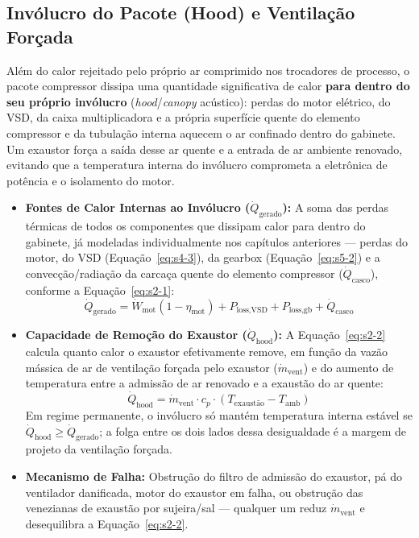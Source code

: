 \documentclass[12pt,a4paper]{article}
\numberwithin{equation}{section}
\numberwithin{table}{section}
\numberwithin{figure}{section}
\begin{document}
{	\subsection{\textbf{Invólucro do Pacote (Hood) e Ventilação Forçada}}
	Além do calor rejeitado pelo próprio ar comprimido nos trocadores de processo, o pacote compressor dissipa uma quantidade significativa de calor \textbf{para dentro do seu próprio invólucro} (\textit{hood}/\textit{canopy} acústico): perdas do motor elétrico, do VSD, da caixa multiplicadora e a própria superfície quente do elemento compressor e da tubulação interna aquecem o ar confinado dentro do gabinete. Um exaustor força a saída desse ar quente e a entrada de ar ambiente renovado, evitando que a temperatura interna do invólucro comprometa a eletrônica de potência e o isolamento do motor.
	\begin{itemize}
		\item \textbf{Fontes de Calor Internas ao Invólucro ($\dot{Q}_{\text{gerado}}$):} A soma das perdas térmicas de todos os componentes que dissipam calor para dentro do gabinete, já modeladas individualmente nos capítulos anteriores — perdas do motor, do VSD (Equação~\eqref{eq:s4-3}), da gearbox (Equação~\eqref{eq:s5-2}) e a convecção/radiação da carcaça quente do elemento compressor ($\dot{Q}_{\text{casco}}$), conforme a Equação~\eqref{eq:s2-1}:
		\begin{equation}\label{eq:s2-1}
\dot{Q}_{\text{gerado}} = \dot{W}_{\text{mot}}(1 - \eta_{\text{mot}}) + P_{\text{loss,VSD}} + P_{\text{loss,gb}} + \dot{Q}_{\text{casco}}
\end{equation}
		\item \textbf{Capacidade de Remoção do Exaustor ($\dot{Q}_{\text{hood}}$):} A Equação~\eqref{eq:s2-2} calcula quanto calor o exaustor efetivamente remove, em função da vazão mássica de ar de ventilação forçada pelo exaustor ($\dot{m}_{\text{vent}}$) e do aumento de temperatura entre a admissão de ar renovado e a exaustão do ar quente:
		\begin{equation}\label{eq:s2-2}
\dot{Q}_{\text{hood}} = \dot{m}_{\text{vent}} \cdot c_p \cdot (T_{\text{exaustão}} - T_{\text{amb}})
\end{equation}
		Em regime permanente, o invólucro só mantém temperatura interna estável se $\dot{Q}_{\text{hood}} \ge \dot{Q}_{\text{gerado}}$; a folga entre os dois lados dessa desigualdade é a margem de projeto da ventilação forçada.
		\item \textbf{Mecanismo de Falha:} Obstrução do filtro de admissão do exaustor, pá do ventilador danificada, motor do exaustor em falha, ou obstrução das venezianas de exaustão por sujeira/sal — qualquer um reduz $\dot{m}_{\text{vent}}$ e desequilibra a Equação~\eqref{eq:s2-2}.

\end{itemize}}
\end{document}
